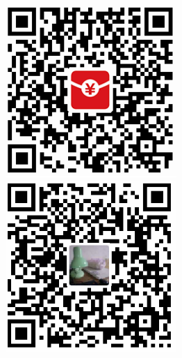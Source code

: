 \documentclass[doctor,openright,twoside]{sjtuthesis}
\theoremstyle{plain}
\theoremstyle{definition}
\theoremstyle{remark}
\theoremstyle{ocrenumbox}
\theoremstyle{plain}
\begin{document}
\begin{figure}[!htp]
  \centering
  \includegraphics[width=.4\linewidth-1cm]{images/zhifubaohongbao.png}
  \hspace{1cm}
  \includegraphics[width=.4\linewidth-1cm]{images/zhifubaozhifu.png}
  \label{fig:zhifubao}
\end{figure}
\end{document}
